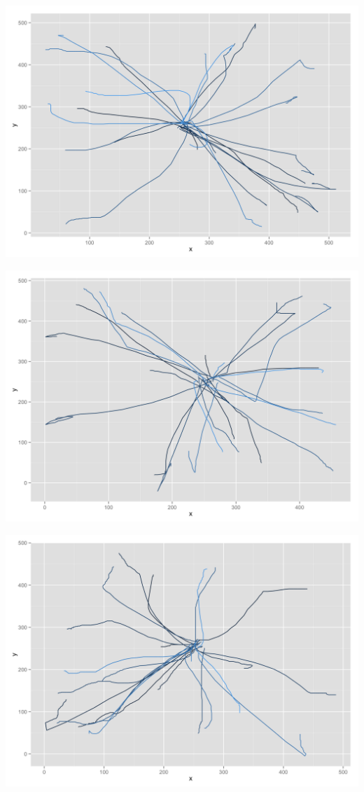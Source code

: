 \begin{appendices}
\begin{minipage}{\textwidth}
\begin{minipage}{0.5\linewidth}
		\includegraphics[width=\linewidth]{images/plots/plot_analysis_qualitative_170}
	\end{minipage}
	\begin{minipage}{0.5\linewidth}
		\includegraphics[width=\linewidth]{images/plots/plot_analysis_qualitative_176}
	\end{minipage}
	\begin{minipage}{0.5\linewidth}
		\includegraphics[width=\linewidth]{images/plots/plot_analysis_qualitative_154}

\end{minipage}
\end{minipage}
\end{appendices}
